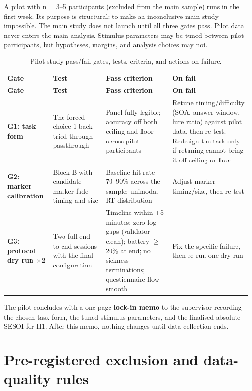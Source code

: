 A pilot with n = 3–5 participants (excluded from the main sample) runs in the first week. Its purpose
is structural: to make an inconclusive main study impossible. The main study does not launch until
all three gates pass. Pilot data never enters the main analysis. Stimulus parameters may be tuned
between pilot participants, but hypotheses, margins, and analysis choices may not.

\begin{longtable}{p{}|p{}|p{}|p{}}
\caption{Pilot study pass/fail gates, tests, criteria, and actions on failure.}\\
\hline
\textbf{Gate} & \textbf{Test} & \textbf{Pass criterion} & \textbf{On fail} \\
\hline
\endfirsthead
\hline
\textbf{Gate} & \textbf{Test} & \textbf{Pass criterion} & \textbf{On fail} \\
\hline
\endhead
\hline
\textbf{G1: task form} & The forced-choice 1-back tried through passthrough & Panel fully legible; accuracy off both ceiling and floor across pilot participants & Retune timing/difficulty (SOA, answer window, lure ratio) against pilot data, then re-test. Redesign the task only if retuning cannot bring it off ceiling or floor \\
\textbf{G2: marker calibration} & Block B with candidate marker fade timing and size & Baseline hit rate 70–90\% across the sample; unimodal RT distribution & Adjust marker timing/size, then re-test \\
\textbf{G3: protocol dry run $\times$2} & Two full end-to-end sessions with the final configuration & Timeline within $\pm$5 minutes; zero log gaps (validator clean); battery $\geq$ 20\% at end; no sickness terminations; questionnaire flow smooth & Fix the specific failure, then re-run one dry run \\
\hline
\end{longtable}

The pilot concludes with a one-page \textbf{lock-in memo} to the supervisor recording the chosen task
form, the tuned stimulus parameters, and the finalised absolute SESOI for H1. After this memo,
nothing changes until data collection ends.


\section{Pre-registered exclusion and data-quality rules}

